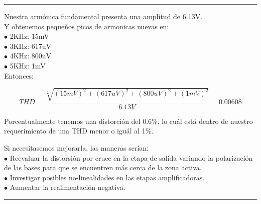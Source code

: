 \documentclass[12pt,a4paper]{report}
\begin{document}
\begin{flushleft}
\vfill
\textcolor{red}{\rule{15cm}{0.2mm}}\par \vspace{0.5cm}
\newpage
Nuestra armónica fundamental presenta una amplitud de 6.13V. \\
Y obtenemos pequeños picos de armonicas nuevas en:\\
\hspace{0.5cm} $\bullet $ 2KHz: 15mV \\ \vspace{0.2cm}
\hspace{0.5cm} $\bullet $ 3KHz: 617uV \\ \vspace{0.2cm}
\hspace{0.5cm} $\bullet $ 4KHz: 800uV \\ \vspace{0.2cm}
\hspace{0.5cm} $\bullet $ 5KHz: 1mV \\ \vspace{0.2cm}
Entonces:\\ \vspace{0.2cm}

\[ THD = \frac{\sqrt[2]{(15mV)^2 + (617uV)^2 + (800uV)^2 + (1mV)^2 }}{6.13V} = 0.00608 \]

Porcentualmente tenemos una distorción del 0.6\%, lo cuál está dentro de nuestro requerimiento de una THD menor o iguál al 1\%.

Si necesitasemos mejorarla, las maneras serían:\\ \vspace{0.2cm}
\hspace{0.5cm} $\bullet $ Reevaluar la distorsión por cruce en la etapa de salida variando la polarización de las bases para que se encuentren más cerca de la zona activa. \\ \vspace{0.2cm}
\hspace{0.5cm} $\bullet $ Investigar posibles no-linealidades en las etapas amplificadoras. \\ \vspace{0.2cm}
\hspace{0.5cm} $\bullet $ Aumentar la realimentación negativa. \\ \vspace{0.2cm}


\vfill
\textcolor{red}{\rule{15cm}{0.2mm}}\par \vspace{0.5cm}
\newpage


\end{flushleft}
\end{document}
